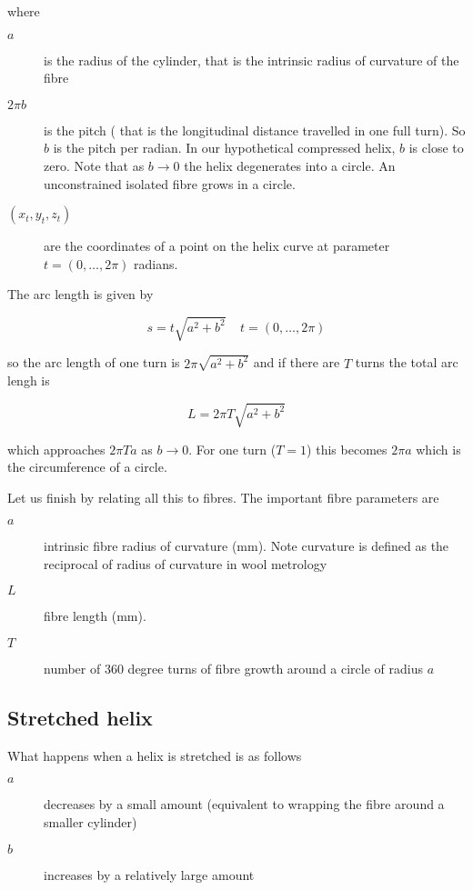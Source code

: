 \documentclass[titlepage,10pt]{article}  %
\begin{document}
where

\begin{description}
\item[$a$] is the radius of the cylinder, that is the intrinsic radius of curvature of the fibre
\item[$2\pi b$] is the pitch ( that is the longitudinal distance travelled in one full turn). So $b$ is the pitch per radian. In our hypothetical compressed helix, $b$ is close to zero. Note that as $b \rightarrow 0$ the helix degenerates into a circle. An unconstrained isolated fibre grows in a circle.
\item[$(x_{t},y_{t},z_{t})$] are the coordinates of a point on the helix curve at parameter $t = (0, \ldots,2\pi)$ radians.
\end{description}

The arc length is given by

\begin{displaymath}
s = t \sqrt{a^{2} + b^{2}} \; \; \;  \; t = (0, \ldots ,2\pi)
\end{displaymath}

so the arc length of one turn is $2 \pi \sqrt{a^{2} + b^{2}}$ and if there are $T$ turns the total arc lengh is 

\begin{displaymath}
L = 2 \pi T \sqrt{a^{2} + b^{2}}
\end{displaymath}

which approaches $2 \pi T a$ as $b \rightarrow 0$. For one turn ($T = 1$) this becomes $2 \pi a$ which is the circumference of a circle.

Let us finish by relating all this to fibres. The important fibre parameters are

\begin{description}
\item[$a$] intrinsic fibre radius of curvature (mm). Note curvature is defined as the reciprocal of radius of curvature in wool metrology
\item[$L$] fibre length (mm).
\item[$T$] number of 360 degree turns of fibre growth around a circle of radius $a$
\end{description}

\subsection{Stretched helix}
\label{sec:stretchmath}
What happens when a helix is stretched is as follows
\begin{description}
\item[$a$] decreases by a small amount (equivalent to wrapping the fibre around a smaller cylinder)
\item[$b$] increases by a relatively large amount
\end{description}
\end{document}
